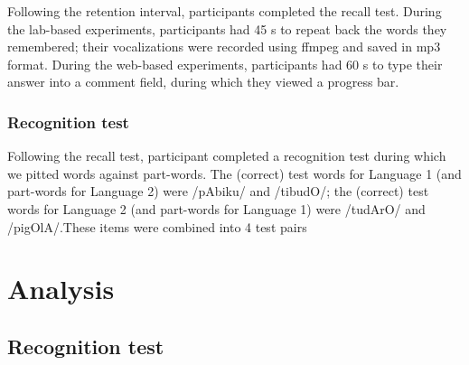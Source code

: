 \documentclass[]{article}
\begin{document}
Following the retention interval, participants completed the recall
test. During the lab-based experiments, participants had 45 s to repeat
back the words they remembered; their vocalizations were recorded using
ffmpeg and saved in mp3 format. During the web-based experiments,
participants had 60 s to type their answer into a comment field, during
which they viewed a progress bar.

\subsubsection{Recognition test}\label{recognition-test}

Following the recall test, participant completed a recognition test
during which we pitted words against part-words. The (correct) test
words for Language 1 (and part-words for Language 2) were /pAbiku/ and
/tibudO/; the (correct) test words for Language 2 (and part-words for
Language 1) were /tudArO/ and /pigOlA/.These items were combined into 4
test pairs

\section{Analysis}\label{analysis}

\subsection{Recognition test}\label{recognition-test-1}
\end{document}
